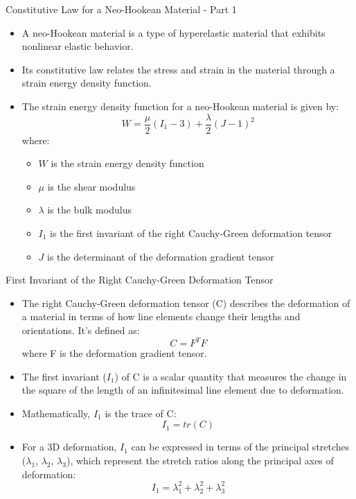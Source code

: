 \documentclass{beamer}
\begin{document}
\begin{frame}{Constitutive Law for a Neo-Hookean Material - Part 1}
\begin{itemize}
\item A neo-Hookean material is a type of hyperelastic material that exhibits nonlinear elastic behavior.
\item Its constitutive law relates the stress and strain in the material through a strain energy density function.
\item The strain energy density function for a neo-Hookean material is given by:
\begin{equation*}
W = \frac{\mu}{2} (I_1 - 3) + \frac{\lambda}{2} (J - 1)^2
\end{equation*}
where:
\begin{itemize}
\item $W$ is the strain energy density function
\item $\mu$ is the shear modulus
\item $\lambda$ is the bulk modulus
\item $I_1$ is the first invariant of the right Cauchy-Green deformation tensor
\item $J$ is the determinant of the deformation gradient tensor
\end{itemize}
\end{itemize}
\end{frame}

\begin{frame}{First Invariant of the Right Cauchy-Green Deformation Tensor}
\begin{itemize}
\item The right Cauchy-Green deformation tensor (C) describes the deformation of a material in terms of how line elements change their lengths and orientations. It's defined as:
\begin{equation*}
C = F^T F
\end{equation*}
where F is the deformation gradient tensor.
\item The first invariant ($I_1$) of C is a scalar quantity that measures the change in the square of the length of an infinitesimal line element due to deformation.
\item Mathematically, $I_1$ is the trace of C:
\begin{equation*}
I_1 = tr(C)
\end{equation*}
\item For a 3D deformation, $I_1$ can be expressed in terms of the principal stretches ($\lambda_1$, $\lambda_2$, $\lambda_3$), which represent the stretch ratios along the principal axes of deformation:
\begin{equation*}
I_1 = \lambda_1^2 + \lambda_2^2 + \lambda_3^2
\end{equation*}
\end{itemize}
\end{frame}
\end{document}
